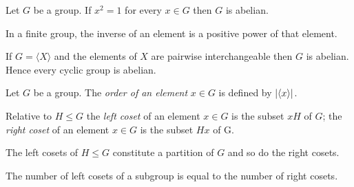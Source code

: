 \begin{lemma}
	Let $G$ be a group. If $x^2 = 1$ for every $x \in G$ then $G$ is abelian.
\end{lemma}

\vspace{2mm}


\vspace{2mm}

\begin{proposition}
	In a finite group, the inverse of an element is a positive power of that element.
\end{proposition}



\vspace{2mm}


\vspace{2mm}

\begin{proposition}
	If $G = \langle X \rangle$ and the elements of $X$ are pairwise interchangeable then $G$ is abelian. Hence every cyclic group is abelian.
\end{proposition}

\vspace{2mm}

\begin{definition}
	Let $G$ be a group. The \emph{order of an element} $x \in G$ is defined by $\abs[0]{\langle x \rangle}$.
\end{definition}

\vspace{2mm}

\begin{definition}
	Relative to $H \leq G$ the \emph{left coset} of an element $x \in G$ is the subset $xH$ of $G$; the \emph{right coset} of an element $x \in G$ is the subset $Hx$ of G.
\end{definition}

\vspace{2mm}

\begin{proposition}
	The left cosets of $H \leq G$ constitute a partition of $G$ and so do the right cosets.	
\end{proposition}

\vspace{2mm}

\begin{proposition}
	The number of left cosets of a subgroup is equal to the number of right cosets.
\end{proposition}


